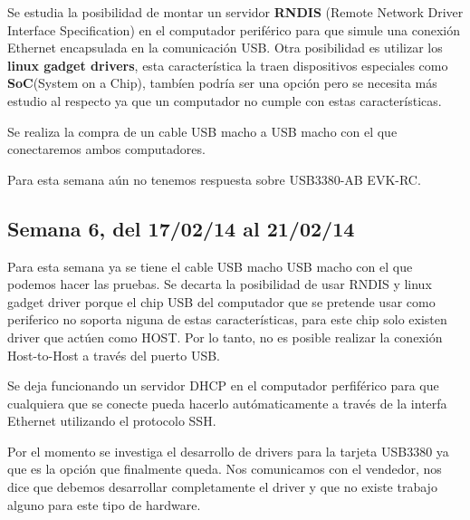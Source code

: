 \documentclass[11pt,oneside,titlepage]{article}
\begin{document}
Se estudia la posibilidad de montar un servidor \textbf{RNDIS} (Remote Network Driver Interface Specification) en el computador periférico para que simule una conexión Ethernet encapsulada en la comunicación USB. Otra posibilidad es utilizar los \textbf{linux gadget drivers}, esta característica la traen dispositivos especiales como \textbf{SoC}(System on a Chip), tambíen podría ser una opción pero se necesita más estudio al respecto ya que un computador no cumple con estas características.

Se realiza la compra de un cable USB macho a USB macho con el que conectaremos ambos computadores.

Para esta semana aún no tenemos respuesta sobre USB3380-AB EVK-RC.

\subsection*{Semana 6, del 17/02/14 al 21/02/14}
\begin{comment}
LUNES 
- Se adquirio el cable, se connecto pero no funciono. Se revisa si los
módulos estan compilados.  
- Estudiar la posibilidad de crear un driver.  
- Se manda correo a lista-usb. Espera de respuesta.
MARTES 
- No es posible conectar el cable usb entre PC. El hardware USB que
traen los PCI no es soportado por el driver linux gadget que es el encargado de
realizar esta conexión, 
- Hemos descartado la posibilidad de conectar PC to PC
con un cable simple.  Decidimos realizar la conexión a través de ethernet.
MIERCOLES 
- NAAAAAAAAAAAAADAAAAAAAAAAAAAAA 
JUEVES 
- NNNNNNNNNNNNAAAAAAAAAAAADAAAAAAAaaaa 
VIERNES 
- NAAAAAAAAAAAAAAAADAAAAAAAAAAAa
\end{comment}

Para esta semana ya se tiene el cable USB macho USB macho con el que podemos hacer las pruebas. Se decarta la posibilidad de usar RNDIS y linux gadget driver porque el chip USB del computador que se pretende usar como periferico no soporta niguna de estas características, para este chip solo existen driver que actúen como HOST. Por lo tanto, no es posible realizar la conexión Host-to-Host a través del puerto USB. 

Se deja funcionando un servidor DHCP en el computador perfiférico para que cualquiera que se conecte pueda hacerlo autómaticamente a través de la interfa Ethernet utilizando el protocolo SSH.

Por el momento se investiga el desarrollo de drivers para la tarjeta USB3380 ya que es la opción que finalmente queda. Nos comunicamos con el vendedor, nos dice que debemos desarrollar completamente el driver y que no existe trabajo alguno para este tipo de hardware.
\end{document}
